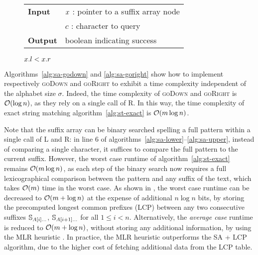 \begin{figure*}[b!]
\begin{center}
\begin{minipage}[t]{.6\textwidth}
\begin{algorithm}[H]
\begin{tabular}{ll}
\textbf{Input}  & $x$ : pointer to a suffix array node\\
				& $c$ : character to query\\
\textbf{Output} & boolean indicating success\\
\end{tabular}
\begin{algorithmic}[1]
	\State \Return \False
\EndIf
{}
\State \Return $x.l < x.r$
\end{algorithmic}
\label{alg:sa-godownc}
\end{algorithm}
\end{minipage}
\end{center}
\end{figure*}

Algorithms~\ref{alg:sa-godown} and \ref{alg:sa-goright} show how to implement respectively \textsc{goDown} and \textsc{goRight} to exhibit a time complexity independent of the alphabet size $\sigma$.
Indeed, the time complexity of \textsc{goDown} and \textsc{goRight} is $\mathcal{O}(\log{n})$, as they rely on a single call of \textsc{R}.
In this way, the time complexity of exact string matching algorithm~\ref{alg:st-exact} is $\mathcal{O}(m \log{n})$.

Note that the suffix array can be binary searched spelling a full pattern within a single call of \textsc{L} and \textsc{R}: in line 6 of algorithms~\ref{alg:sa-lower}--\ref{alg:sa-upper}, instead of comparing a single character, it suffices to compare the full pattern to the current suffix.
However, the worst case runtime of algorithm~\ref{alg:st-exact} remains $\mathcal{O}(m \log{n})$, as each step of the binary search now requires a full lexicographical comparison between the pattern and any suffix of the text, which takes $\mathcal{O}(m)$ time in the worst case.
As shown in \citep{Manber1990}, the worst case runtime can be decreased to $\mathcal{O}(m + \log{n})$ at the expense of additional $n \log{n}$ bits, by storing the precomputed longest common prefixes (LCP) between any two consecutive suffixes $\mathbb {S}_{A[i] \dots}$, $\mathbb {S}_{A[i+1] \dots}$ for all $1 \leq i < n$.
Alternatively, the \emph{average case} runtime is reduced to $\mathcal{O}(m + \log{n})$, without storing any additional information, by using the MLR heuristic \citep{Manber1990}.
In practice, the MLR heuristic outperforms the SA + LCP algorithm, due to the higher cost of fetching additional data from the LCP table.

